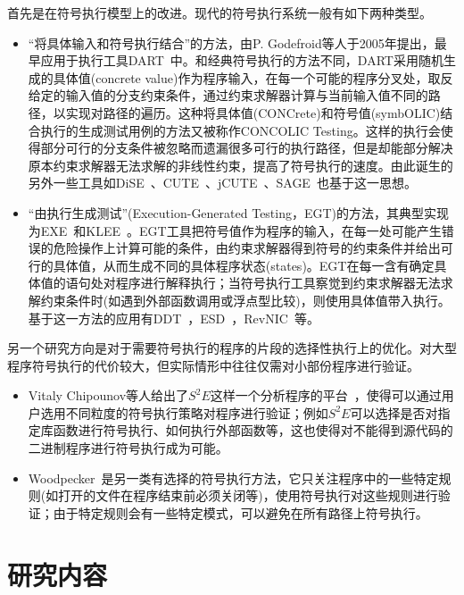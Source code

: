 首先是在符号执行模型上的改进。现代的符号执行系统一般有如下两种类型。
\begin{itemize}
\item “将具体输入和符号执行结合”的方法，由P. Godefroid等人于2005年提出，最早应用于执行工具DART~中。和经典符号执行的方法不同，DART采用随机生成的具体值(concrete value)作为程序输入，在每一个可能的程序分叉处，取反给定的输入值的分支约束条件，通过约束求解器计算与当前输入值不同的路径，以实现对路径的遍历。这种将具体值(CONCrete)和符号值(symbOLIC)结合执行的生成测试用例的方法又被称作CONCOLIC Testing。这样的执行会使得部分可行的分支条件被忽略而遗漏很多可行的执行路径，但是却能部分解决原本约束求解器无法求解的非线性约束，提高了符号执行的速度。由此诞生的另外一些工具如DiSE~、CUTE~、jCUTE~、SAGE~也基于这一思想。
  \item “由执行生成测试”(Execution-Generated Testing，EGT)的方法，其典型实现为EXE~和KLEE~。EGT工具把符号值作为程序的输入，在每一处可能产生错误的危险操作上计算可能的条件，由约束求解器得到符号的约束条件并给出可行的具体值，从而生成不同的具体程序状态(states)。EGT在每一含有确定具体值的语句处对程序进行解释执行；当符号执行工具察觉到约束求解器无法求解约束条件时(如遇到外部函数调用或浮点型比较)，则使用具体值带入执行。基于这一方法的应用有DDT~，ESD~，RevNIC~等。
\end{itemize}

另一个研究方向是对于需要符号执行的程序的片段的选择性执行上的优化。对大型程序符号执行的代价较大，但实际情形中往往仅需对小部份程序进行验证。
\begin{itemize}
\item Vitaly Chipounov等人给出了$S^2E$这样一个分析程序的平台~，使得可以通过用户选用不同粒度的符号执行策略对程序进行验证；例如$S^2E$可以选择是否对指定库函数进行符号执行、如何执行外部函数等，这也使得对不能得到源代码的二进制程序进行符号执行成为可能。
\item Woodpecker~是另一类有选择的符号执行方法，它只关注程序中的一些特定规则(如打开的文件在程序结束前必须关闭等)，使用符号执行对这些规则进行验证；由于特定规则会有一些特定模式，可以避免在所有路径上符号执行。
\end{itemize}

\section{研究内容}
\label{sec:brief}

